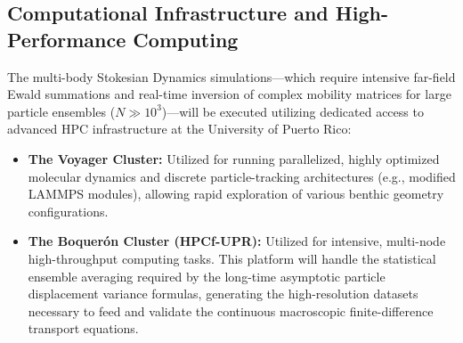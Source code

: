 \subsection{Computational Infrastructure and High-Performance Computing}
The multi-body Stokesian Dynamics simulations—which require intensive far-field Ewald summations and real-time inversion of complex mobility matrices for large particle ensembles ($N \gg 10^3$)---will be executed utilizing dedicated access to advanced HPC infrastructure at the University of Puerto Rico:
\begin{itemize}
    \item \textbf{The Voyager Cluster:} Utilized for running parallelized, highly optimized molecular dynamics and discrete particle-tracking architectures (e.g., modified LAMMPS modules), allowing rapid exploration of various benthic geometry configurations.
    \item \textbf{The Boquer\'{o}n Cluster (HPCf-UPR):} Utilized for intensive, multi-node high-throughput computing tasks. This platform will handle the statistical ensemble averaging required by the long-time asymptotic particle displacement variance formulas, generating the high-resolution datasets necessary to feed and validate the continuous macroscopic finite-difference transport equations.
\end{itemize}

